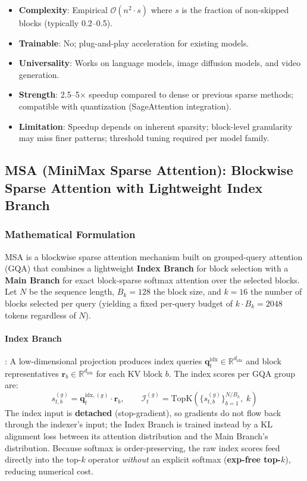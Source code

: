 \begin{itemize}[leftmargin=*]
    \item \textbf{Complexity}: Empirical $\mathcal{O}(n^2 \cdot s)$ where $s$ is the fraction of non-skipped blocks (typically 0.2--0.5).
    \item \textbf{Trainable}: No; plug-and-play acceleration for existing models.
    \item \textbf{Universality}: Works on language models, image diffusion models, and video generation.
    \item \textbf{Strength}: 2.5--5$\times$ speedup compared to dense or previous sparse methods; compatible with quantization (SageAttention integration).
    \item \textbf{Limitation}: Speedup depends on inherent sparsity; block-level granularity may miss finer patterns; threshold tuning required per model family.
\end{itemize}

\subsection{MSA (MiniMax Sparse Attention): Blockwise Sparse Attention with Lightweight Index Branch}

\subsubsection{Mathematical Formulation}

MSA \citep{lai_minimax_2026} is a blockwise sparse attention mechanism built on grouped-query attention (GQA) that combines a lightweight \textbf{Index Branch} for block selection with a \textbf{Main Branch} for exact block-sparse softmax attention over the selected blocks. Let $N$ be the sequence length, $B_k = 128$ the block size, and $k = 16$ the number of blocks selected per query (yielding a fixed per-query budget of $k \cdot B_k = 2048$ tokens regardless of $N$).

\paragraph{Index Branch}: A low-dimensional projection produces index queries $\mathbf{q}_t^{\text{idx}} \in \mathbb{R}^{d_{\text{idx}}}$ and block representatives $\mathbf{r}_b \in \mathbb{R}^{d_{\text{idx}}}$ for each KV block $b$. The index scores per GQA group are:
\[
s_{t,b}^{(g)} = \mathbf{q}_t^{\text{idx},(g)} \cdot \mathbf{r}_b, \qquad \mathcal{I}_t^{(g)} = \mathrm{TopK}\left(\{s_{t,b}^{(g)}\}_{b=1}^{N/B_k},\; k\right)
\]
The index input is \textbf{detached} (stop-gradient), so gradients do not flow back through the indexer's input; the Index Branch is trained instead by a KL alignment loss between its attention distribution and the Main Branch's distribution. Because softmax is order-preserving, the raw index scores feed directly into the top-$k$ operator \emph{without} an explicit softmax (\textbf{exp-free top-$k$}), reducing numerical cost.

